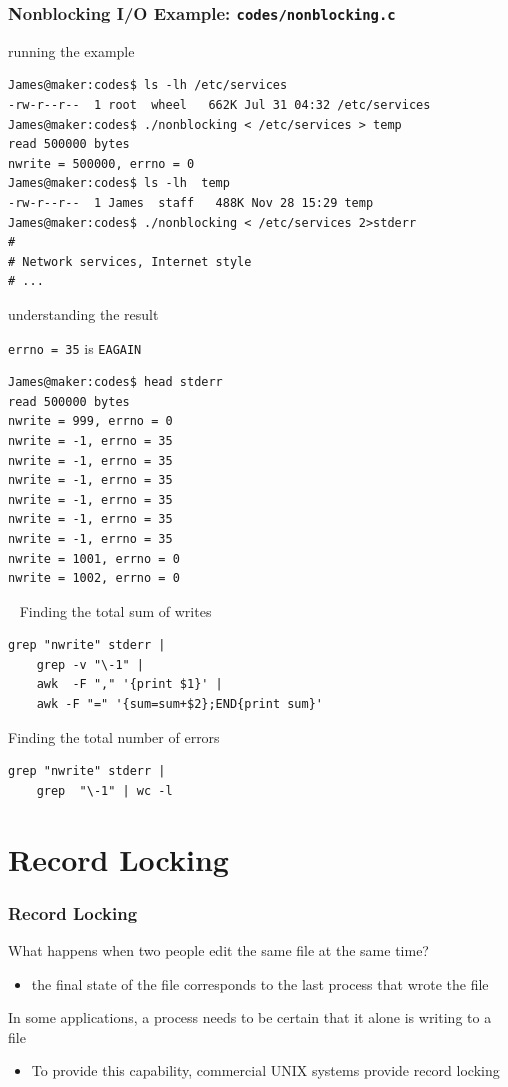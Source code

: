 \documentclass[newPxFont,sthlmFooter,nooffset]{beamer}
\begin{document}
\begin{frame}
  \frametitle{Nonblocking I/O Example: \texttt{codes/nonblocking.c}}





running the example
{\footnotesize
\begin{verbatim}
James@maker:codes$ ls -lh /etc/services
-rw-r--r--  1 root  wheel   662K Jul 31 04:32 /etc/services
James@maker:codes$ ./nonblocking < /etc/services > temp
read 500000 bytes
nwrite = 500000, errno = 0
James@maker:codes$ ls -lh  temp
-rw-r--r--  1 James  staff   488K Nov 28 15:29 temp
James@maker:codes$ ./nonblocking < /etc/services 2>stderr
#
# Network services, Internet style
# ...
\end{verbatim}
}


understanding the result

\texttt{errno = 35} is \texttt{EAGAIN}
\begin{verbatim}
James@maker:codes$ head stderr
read 500000 bytes
nwrite = 999, errno = 0
nwrite = -1, errno = 35
nwrite = -1, errno = 35
nwrite = -1, errno = 35
nwrite = -1, errno = 35
nwrite = -1, errno = 35
nwrite = -1, errno = 35
nwrite = 1001, errno = 0
nwrite = 1002, errno = 0
\end{verbatim}

\bigskip
~
\bigskip
Finding the total sum of writes
\begin{verbatim}
grep "nwrite" stderr |
    grep -v "\-1" |
    awk  -F "," '{print $1}' |
    awk -F "=" '{sum=sum+$2};END{print sum}'
\end{verbatim}

\bigskip

Finding the total number of errors
\begin{verbatim}
grep "nwrite" stderr |
    grep  "\-1" | wc -l
\end{verbatim}

\end{frame}

\section{Record Locking}

\begin{frame}[t]
  \frametitle{Record Locking}
What happens when two people edit the same file at the same time?
\begin{itemize}
\item the final state of the file corresponds to the last process that wrote the file
\end{itemize}

In some applications, a process needs to be certain that it alone is writing to a file
\begin{itemize}
\item To provide this capability, commercial UNIX systems provide record locking
\end{itemize}
\end{frame}
\end{document}

